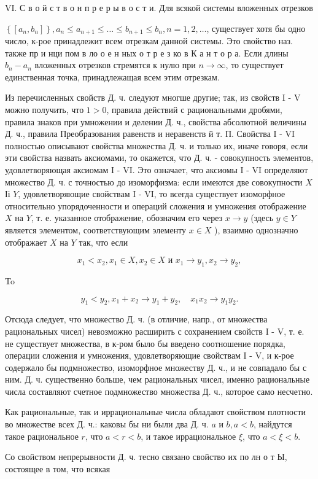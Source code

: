 \documentclass[10pt]{article}
\begin{document}
VI. С в о й с т в о н п р е р ы в о с т и. Для всякой системы вложенных отрезков



$\left\{\left[a_{n}, b_{n}\right]\right\}, a_{n} \leqslant a_{n+1} \leqslant \ldots \leqslant b_{n+1} \leqslant b_{n}, n=1,2, \ldots$, существует хотя бы одно число, к-рое принадлежит всем отрезкам данной системы. Это свойство наз. также пр и нци пом в ло о е н ных о т р е з ко в К а н т о р а. Если длины $b_{n}-a_{n}$ вложенных отрезков стремятся к нулю при $n \rightarrow \infty$, то существует единственная точка, принадлежащая всем этим отрезкам.



Из перечисленных свойств Д. ч. следуют многше другие; так, из свойств I - V можно получить, что $1>0$, правила действий с рациональными дробями, правила знаков при умножении и делении Д. ч., свойства абсолютной величины Д. ч., правила Преобразования равенств и неравенств й т. П. Свойства I - VI полностью описывают свойства множества Д. ч. и только их, иначе говоря, если эти свойства назвать аксиомами, то окажется, что Д. ч. - совокупность элементов, удовлетворяющая аксиомам I - VI. Это означает, что аксиомы I - VI определяют множество Д. ч. с точностью до изоморфизма: если имеются две совокупности $X$ Іі $Y$, удовлетворяющие свойствам I - VI, то всегда существует изоморфное относительно упорядоченности и операций сложения и умножения отображение $X$ на $Y$, т. е. указанное отображение, обозначим его через $x \rightarrow y$ (здесь $y \in Y$ является элементом, соответствующим элементу $x \in X$ ), взаимно однозначно отображает $X$ на $Y$ так, что если



\[

x_{1}<x_{2}, x_{1} \in X, x_{2} \in X \text { и } x_{1} \rightarrow y_{1}, x_{2} \rightarrow y_{2},

\]



To



\[

y_{1}<y_{2}, x_{1}+x_{2} \longrightarrow y_{1}+y_{2}, \quad x_{1} x_{2} \longrightarrow y_{1} y_{2} .

\]



Отсюда следует, что множество Д. ч. (в отличие, напр., от множества рациональных чисел) невозможно расширить с сохранением свойств I - V, т. е. не существует множества, в к-ром было бы введено соотношение порядка, операции сложения и умножения, удовлетворяющие свойствам I - V, и к-рое содержало бы подмножество, изоморфное множеству Д. ч., и не совпадало бы с ним. Д. ч. существенно больше, чем рациональных чисел, именно рациональные числа составляют счетное подмножество множества Д. ч., которое само несчетно.



Как рациональные, так и иррациональные числа обладают свойством плотности во множестве всех Д. ч.: каковы бы ни были два Д. ч. $a$ и $b, a<b$, найдутся такое рациональное $r$, что $a<r<b$, и такое иррациональное $\xi$, что $a<\xi<b$.



Со свойством непрерывности Д. ч. тесно связано свойство их по лн о т Ы, состоящее в том, что всякая
\end{document}
